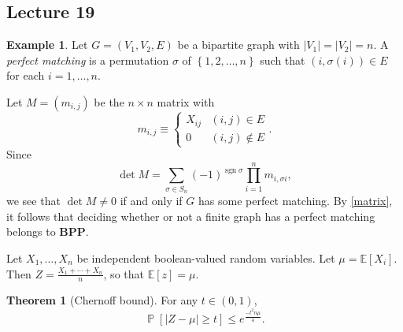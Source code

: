 \documentclass[10pt,letterpaper,cm]{nupset}
\theoremstyle{definition}
\newtheorem{exmp}[definition]{Example}
\theoremstyle{theorem}
\newtheorem{theorem}[definition]{Theorem}
\theoremstyle{remark}
\newcommand{\1}{\mathbf{1}}
\newcommand{\0}{\vec 0}
\DeclareMathOperator{\sgn}{sgn}
\DeclareMathOperator{\pr}{\mathbb{P}}
\begin{document}
\subsection{Lecture 19}

\begin{exmp}
Let $G=\left(V_1, V_2, E\right)$ be a bipartite graph with $\left\lvert{V_1}\right\rvert=\left\lvert{V_2}\right\rvert=n$. 
A \textit{perfect matching} is a permutation $\sigma$ of $\left\{1,2, \ldots, n\right\}$ such that $\left(i, \sigma(i)\right) \in E$ for each $i=1, \ldots, n$.

Let $M= \left(m_{i,j}\right)$ be the $n\times n$ matrix with $$m_{i,j} \equiv \begin{cases} X_{ij} & (i,j) \in E\\ 0 & (i,j) \notin E    \end{cases}.$$ Since $$\det{M} =  \sum_{\sigma \in S_n} ({-1})^{\sgn{\sigma}} \prod_{i=1}^n m_{i, \sigma{i}} ,$$ we see that $\det{M} \ne 0$ if and only if $G$ has some perfect matching. By \cref{matrix}, it follows that deciding whether or not a finite graph has a perfect matching belongs to $\mathbf{BPP}$.
\end{exmp}

\medskip

Let $X_1, \ldots, X_n$ be independent boolean-valued random variables. Let $ \mu = \mathbb{E}[X_i]$. Then $Z= \frac{X_1 + \cdots + X_n}{n}$, so that $\mathbb{E}\left[z\right] = \mu$. 

\begin{theorem}[Chernoff bound]\label{Chb}
 For any $t\in (0,1)$, $$\pr\left[\left\lvert{Z - \mu}\right\rvert \geq t\right] \leq e^{\frac{{-t^2n} \mu}{4}}.$$
\end{theorem}
\end{document}
